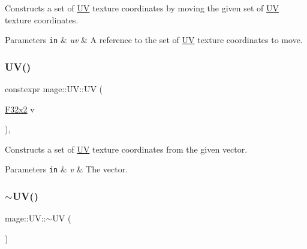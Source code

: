 Constructs a set of \mbox{\hyperlink{structmage_1_1_u_v}{UV}} texture coordinates by moving the given set of \mbox{\hyperlink{structmage_1_1_u_v}{UV}} texture coordinates.


\begin{DoxyParams}[1]{Parameters}
\mbox{\tt in}  & {\em uv} & A reference to the set of \mbox{\hyperlink{structmage_1_1_u_v}{UV}} texture coordinates to move. \\
\hline
\end{DoxyParams}
\mbox{\label{structmage_1_1_u_v_ab5b287a94fef45b70f7c6d50ede33bff}} 
\subsubsection{\texorpdfstring{U\+V()}{UV()}\hspace{0.1cm}{\footnotesize\ttfamily [5/5]}}
{\footnotesize\ttfamily constexpr mage\+::\+U\+V\+::\+UV (\begin{DoxyParamCaption}\item[{\mbox{\hyperlink{namespacemage_a9dc0d34d6ecc87e4cfa4a826102117bc}{F32x2}}}]{v }\end{DoxyParamCaption})\hspace{0.3cm}{\ttfamily [explicit]}, {\ttfamily [noexcept]}}

Constructs a set of \mbox{\hyperlink{structmage_1_1_u_v}{UV}} texture coordinates from the given vector.


\begin{DoxyParams}[1]{Parameters}
\mbox{\tt in}  & {\em v} & The vector. \\
\hline
\end{DoxyParams}
\mbox{\label{structmage_1_1_u_v_a9389be8cc9bb64861b69f79b44b6dd1b}} 
\subsubsection{\texorpdfstring{$\sim$\+U\+V()}{~UV()}}
{\footnotesize\ttfamily mage\+::\+U\+V\+::$\sim$\+UV (\begin{DoxyParamCaption}{ }\end{DoxyParamCaption})\hspace{0.3cm}{\ttfamily [default]}}

